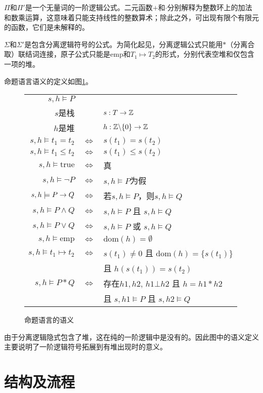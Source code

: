 $\Pi$和$\Pi'$是一个无量词的一阶逻辑公式。二元函数$+$和$\cdot$分别解释为整数环上的加法和数乘运算，这意味着只能支持线性的整数算术；除此之外，可出现有限个有限元的函数，它们是未解释的。

$\Sigma$和$\Sigma'$是包含分离逻辑符号的公式。为简化起见，分离逻辑公式只能用$\ast$（分离合取）联结词连接，原子公式只能是$\mathrm{emp}$和$T_1 \mapsto T_2$的形式，分别代表空堆和仅包含一项的堆。

命题语言语义的定义如图\ref{struct:semantic}。
\begin{figure}[!htbp]
  \centering
  \begin{tabular}{rcl}
    $s, h \models P$ & & \\
    $s$是栈 & & $s: T \rightarrow \mathbb{Z}$ \\
    $h$是堆 & & $h: \mathbb{Z} 	\backslash \{0\} \rightarrow \mathbb{Z}$ \\
    $s, h \models t_1 = t_2$ & $\iff$ & $s(t_1) = s(t_2)$ \\
    $s, h \models t_1 \leq t_2$ & $\iff$ & $s(t_1) \leq s(t_2)$ \\
    $s, h \models \mathrm{true}$ & $\iff$ & 真 \\
    $s, h \models \lnot P$ & $\iff$ & $s, h \models P$为假 \\
    $s, h \models P \rightarrow Q$ & $\iff$ & 若$s, h \models P$，则$s, h \models Q$ \\
    $s, h \models P \land Q$ & $\iff$ & $s, h \models P$ 且 $s, h \models Q$ \\
    $s, h \models P \lor Q$ & $\iff$ & $s, h \models P$ 或 $s, h \models Q$ \\
    $s, h \models \mathrm{emp}$ & $\iff$ & $\mathrm{dom}(h)= \emptyset$ \\
    $s, h \models t_1 \mapsto t_2$ & $\iff$ & $s(t_1) \neq 0$ 且 $\mathrm{dom}(h) = \{s(t_1)\}$ \\
    & & 且 $h(s(t_1)) = s(t_2)$ \\
    $s, h \models P \ast Q$ & $\iff$ & 存在$h1, h2$, $h1 \bot h2$ 且 $h = h1 \ast h2$ \\
    & & 且 $s, h1 \models P$ 且 $s, h2 \models Q$ \\
  \end{tabular}
  \caption{命题语言的语义}
  \label{struct:semantic}
\end{figure}

由于分离逻辑隐式包含了堆，这在纯的一阶逻辑中是没有的。因此图中的语义定义主要说明了一阶逻辑符号拓展到有堆出现时的意义。

\section{结构及流程}

